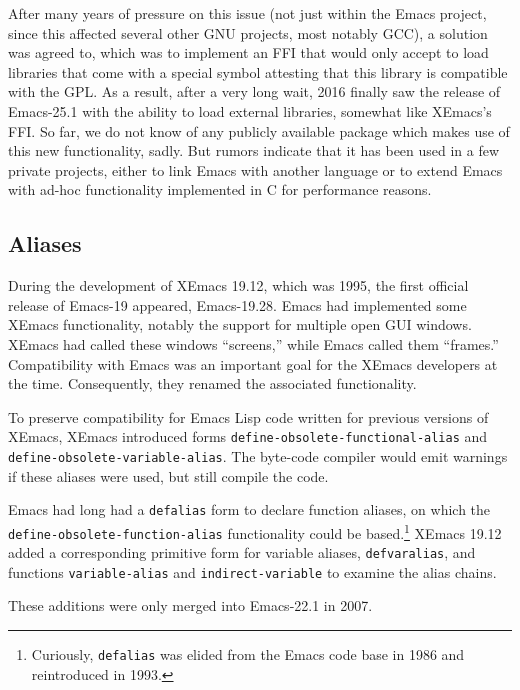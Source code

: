 \documentclass[format=acmsmall, review]{acmart}
\newcommand \Elisp {Emacs Lisp}
\begin{document}
After many years of pressure on this issue (not just within the Emacs
project, since this affected several other GNU projects, most notably GCC),
a solution was agreed to, which was to implement an FFI that would only
accept to load libraries that come with a special symbol attesting that this
library is compatible with the GPL.  As a result, after a very long wait,
2016 finally saw the release of Emacs-25.1 with the ability to load external
libraries, somewhat like XEmacs's FFI.  So far, we do not know of any publicly
available package which makes use of this new functionality, sadly.
But rumors indicate that it has been used in a few private projects, either
to link Emacs with another language or to extend Emacs with ad-hoc
functionality implemented in C for performance reasons.

\subsection{Aliases}

During the development of XEmacs 19.12, which was 1995, the first
official release of Emacs-19 appeared, Emacs-19.28.  Emacs had
implemented some XEmacs functionality, notably the support for
multiple open GUI windows.  XEmacs had called these windows
``screens,'' while Emacs called them ``frames.''  Compatibility with
Emacs was an important goal for the XEmacs developers at the time.
Consequently, they renamed the associated functionality.

To preserve compatibility for \Elisp{} code written for previous
versions of XEmacs, XEmacs introduced forms
\texttt{define-obsolete-functional-alias} and
\texttt{define-obsolete-variable-alias}.  The byte-code compiler would
emit warnings if these aliases were used, but still compile the code.

Emacs had long had a \texttt{defalias} form to declare function
aliases, on which the \texttt{define-\linebreak[0]obsolete-\linebreak[0]function-\linebreak[0]alias}
functionality could be based.\footnote{Curiously, \texttt{defalias}
  was elided from the Emacs code base in 1986 and reintroduced in
  1993.}  XEmacs 19.12 added a corresponding primitive form for variable
aliases, \texttt{defvaralias}, and functions \texttt{variable-alias}
and \texttt{indirect-variable} to examine the alias chains.

These additions were only merged into Emacs-22.1 in 2007.
\end{document}
